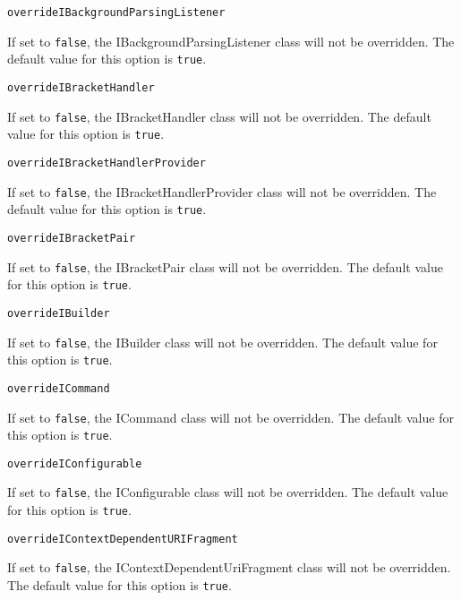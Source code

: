\noindent\texttt{overrideIBackgroundParsingListener}
\begin{myindentpar}{1cm}
If set to \texttt{false}, the IBackgroundParsingListener class will not be overridden. The default value for this option is \texttt{true}.
\end{myindentpar}

\noindent\texttt{overrideIBracketHandler}
\begin{myindentpar}{1cm}
If set to \texttt{false}, the IBracketHandler class will not be overridden. The default value for this option is \texttt{true}.
\end{myindentpar}

\noindent\texttt{overrideIBracketHandlerProvider}
\begin{myindentpar}{1cm}
If set to \texttt{false}, the IBracketHandlerProvider class will not be overridden. The default value for this option is \texttt{true}.
\end{myindentpar}

\noindent\texttt{overrideIBracketPair}
\begin{myindentpar}{1cm}
If set to \texttt{false}, the IBracketPair class will not be overridden. The default value for this option is \texttt{true}.
\end{myindentpar}

\noindent\texttt{overrideIBuilder}
\begin{myindentpar}{1cm}
If set to \texttt{false}, the IBuilder class will not be overridden. The default value for this option is \texttt{true}.
\end{myindentpar}

\noindent\texttt{overrideICommand}
\begin{myindentpar}{1cm}
If set to \texttt{false}, the ICommand class will not be overridden. The default value for this option is \texttt{true}.
\end{myindentpar}

\noindent\texttt{overrideIConfigurable}
\begin{myindentpar}{1cm}
If set to \texttt{false}, the IConfigurable class will not be overridden. The default value for this option is \texttt{true}.
\end{myindentpar}

\noindent\texttt{overrideIContextDependentURIFragment}
\begin{myindentpar}{1cm}
If set to \texttt{false}, the IContextDependentUriFragment class will not be overridden. The default value for this option is \texttt{true}.
\end{myindentpar}


